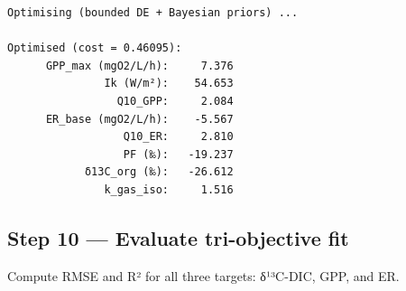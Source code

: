 \documentclass[
  letterpaper,
  DIV=11,
  numbers=noendperiod]{scrartcl}
\begin{document}
\begin{verbatim}
Optimising (bounded DE + Bayesian priors) ...

Optimised (cost = 0.46095):
      GPP_max (mgO2/L/h):     7.376
               Ik (W/m²):    54.653
                 Q10_GPP:     2.084
      ER_base (mgO2/L/h):    -5.567
                  Q10_ER:     2.810
                  PF (‰):   -19.237
            δ13C_org (‰):   -26.612
               k_gas_iso:     1.516
\end{verbatim}

\subsection{Step 10 --- Evaluate tri-objective
fit}\label{step-10-evaluate-tri-objective-fit}

Compute RMSE and R² for all three targets: δ¹³C-DIC, GPP, and ER.
\end{document}
